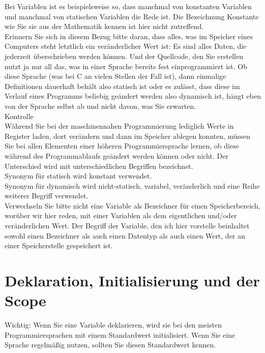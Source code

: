 Bei Variablen ist es beispielsweise so, dass manchmal von konstanten Variablen und manchmal von statischen Variablen die Rede ist. Die Bezeichnung Konstante wie Sie sie aus der Mathematik kennen ist hier nicht zutreffend.\\

Erinnern Sie sich in diesem Bezug bitte daran, dass alles, was im Speicher eines Computers steht letztlich ein veränderlicher Wert ist: Es sind alles Daten, die jederzeit überschrieben werden können. Und der Quellcode, den Sie erstellen nutzt ja nur all das, was in einer Sprache bereits fest einprogrammiert ist. Ob diese Sprache (was bei C an vielen Stellen der Fall ist), dann einmalige Definitionen dauerhaft behält also statisch ist oder es zulässt, dass diese im Verlauf eines Programms beliebig geändert werden also dynamisch ist, hängt eben von der Sprache selbst ab und nicht davon, was Sie erwarten.\\

Kontrolle\\

Während Sie bei der maschinennahen Programmierung lediglich Werte in Register laden, dort verändern und dann im Speicher ablegen konnten, müssen Sie bei allen Elementen einer höheren Programmiersprache lernen, ob diese während des Programmablaufs geändert werden können oder nicht. Der Unterschied wird mit unterschiedlichen Begriffen bezeichnet.\\

Synonym für statisch wird konstant verwendet.\\

Synonym für dynamisch wird nicht-statisch, variabel, veränderlich und eine Reihe weiterer Begriff verwendet. \\

Verwechseln Sie bitte nicht eine Variable als Bezeichner für einen Speicherbereich, worüber wir hier reden, mit einer Variablen als dem eigentlichen und/oder veränderlichen Wert. Der Begriff der Variable, den ich hier vorstelle beinhaltet sowohl einen Bezeichner als auch einen Datentyp als auch einen Wert, der an einer Speicherstelle gespeichert ist.


\section{Deklaration, Initialisierung und der Scope}




Wichtig: Wenn Sie eine Variable deklarieren, wird sie bei den meisten Programmiersprachen mit einem Standardwert initialisiert. Wenn Sie eine Sprache regelmäßig nutzen, sollten Sie diesen Standardwert kennen.\\

